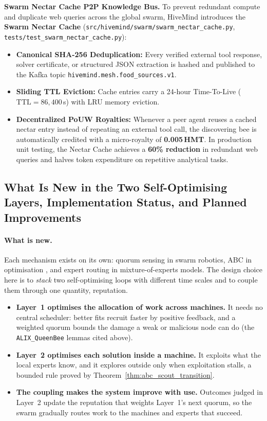 \documentclass[11pt,a4paper]{article}
\begin{document}
\textbf{Swarm Nectar Cache P2P Knowledge Bus.} To prevent redundant compute and duplicate web queries across the global swarm, HiveMind introduces the \textbf{Swarm Nectar Cache} (\texttt{src/\allowbreak hivemind/\allowbreak swarm/\allowbreak swarm\_nectar\_cache.py}, \texttt{tests/\allowbreak test\_swarm\_nectar\_cache.py}):
\begin{itemize}[leftmargin=1.8em]
    \item \textbf{Canonical SHA-256 Deduplication:} Every verified external tool response, solver certificate, or structured JSON extraction is hashed and published to the Kafka topic \texttt{hivemind.mesh.food\_sources.v1}.
    \item \textbf{Sliding TTL Eviction:} Cache entries carry a 24-hour Time-To-Live ($\text{TTL} = 86{,}400$\,s) with LRU memory eviction.
    \item \textbf{Decentralized PoUW Royalties:} Whenever a peer agent reuses a cached nectar entry instead of repeating an external tool call, the discovering bee is automatically credited with a micro-royalty of \textbf{0.005\,HMT}. In production unit testing, the Nectar Cache achieves a \textbf{60\% reduction} in redundant web queries and halves token expenditure on repetitive analytical tasks.
\end{itemize}

\subsection{What Is New in the Two Self-Optimising Layers, Implementation Status, and Planned Improvements}
\label{sec:bilayer_status_improvements}

\paragraph{What is new.} Each mechanism exists on its own: quorum sensing in swarm robotics, ABC in optimisation
\cite{karaboga2005abc}, and expert routing in mixture-of-experts models. The design choice here is to \emph{stack} two
self-optimising loops with different time scales and to couple them through one quantity, reputation.
\begin{itemize}[leftmargin=1.8em,itemsep=2pt]
  \item \textbf{Layer~1 optimises the allocation of work across machines.} It needs no central scheduler: better fits
    recruit faster by positive feedback, and a weighted quorum bounds the damage a weak or malicious node can do (the
    \texttt{ALIX\_QueenBee} lemmas cited above).
  \item \textbf{Layer~2 optimises each solution inside a machine.} It exploits what the local experts know, and it
    explores outside only when exploitation stalls, a bounded rule proved by Theorem~\ref{thm:abc_scout_transition}.
  \item \textbf{The coupling makes the system improve with use.} Outcomes judged in Layer~2 update the reputation that
    weights Layer~1's next quorum, so the swarm gradually routes work to the machines and experts that succeed.
\end{itemize}
\end{document}
